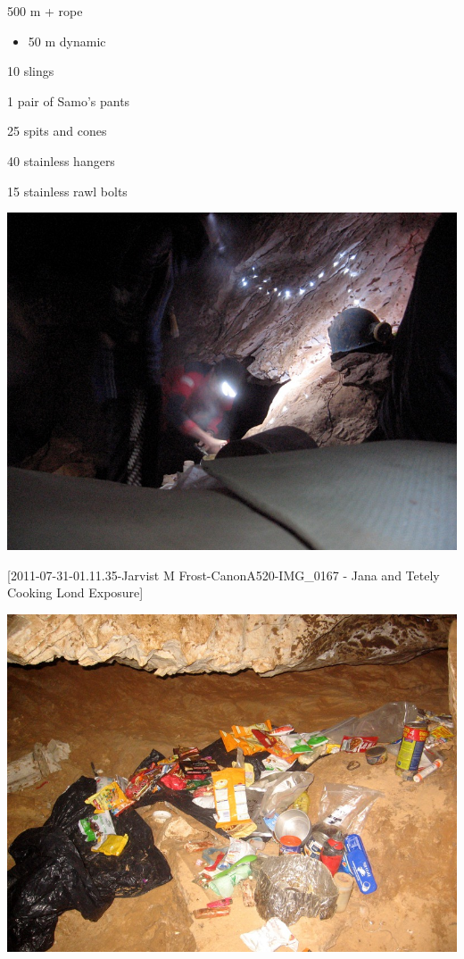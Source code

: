 500 m + rope

\begin{itemize}
\tightlist
\item
  50 m dynamic
\end{itemize}

10 slings

1 pair of Samo's pants

25 spits and cones

40 stainless hangers

15 stainless rawl bolts

\includegraphics{UgLog1012/58.png}

{[}2011-07-31-01.11.35-Jarvist M Frost-CanonA520-IMG\_0167 - Jana and
Tetely Cooking Lond Exposure{]}

\includegraphics{UgLog1012/59.png}

